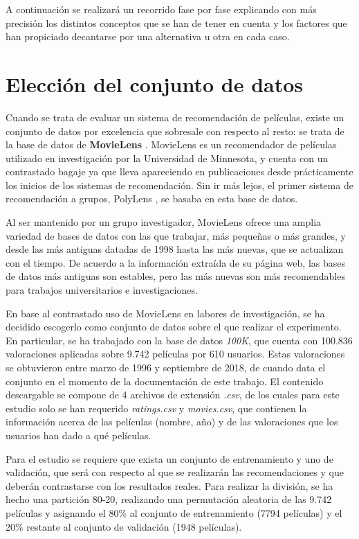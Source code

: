 A continuación se realizará un recorrido fase por fase explicando con más precisión los distintos conceptos que se han de tener en cuenta y los factores que han propiciado decantarse por una alternativa u otra en cada caso.

\section{Elección del conjunto de datos}

Cuando se trata de evaluar un sistema de recomendación de películas, existe un conjunto de datos por excelencia que sobresale con respecto al resto: se trata de la base de datos de \textbf{MovieLens} \cite{movielens} \cite{movielens-paper}. MovieLens es un recomendador de películas utilizado en investigación por la Universidad de Minnesota, y cuenta con un contrastado bagaje ya que lleva apareciendo en publicaciones desde prácticamente los inicios de los sistemas de recomendación. Sin ir más lejos, el primer sistema de recomendación a grupos, PolyLens \cite{polylens}, se basaba en esta base de datos.

Al ser mantenido por un grupo investigador, MovieLens ofrece una amplia variedad de bases de datos con las que trabajar, más pequeñas o más grandes, y desde las más antiguas datadas de 1998 hasta las más nuevas, que se actualizan con el tiempo. De acuerdo a la información extraída de su página web, las bases de datos más antiguas son estables, pero las más nuevas son más recomendables para trabajos universitarios e investigaciones.

En base al contrastado uso de MovieLens en labores de investigación, se ha decidido escogerlo como conjunto de datos sobre el que realizar el experimento. En particular, se ha trabajado con la base de datos \textit{100K}, que cuenta con 100.836 valoraciones aplicadas sobre 9.742 películas por 610 usuarios. Estas valoraciones se obtuvieron entre marzo de 1996 y septiembre de 2018, de cuando data el conjunto en el momento de la documentación de este trabajo. El contenido descargable se compone de 4 archivos de extensión \textit{.csv}, de los cuales para este estudio solo se han requerido \textit{ratings.csv} y \textit{movies.csv}, que contienen la información acerca de las películas (nombre, año) y de las valoraciones que los usuarios han dado a qué películas.

Para el estudio se requiere que exista un conjunto de entrenamiento y uno de validación, que será con respecto al que se realizarán las recomendaciones y que deberán contrastarse con los resultados reales. Para realizar la división, se ha hecho una partición 80-20, realizando una permutación aleatoria de las 9.742 películas y asignando el 80\% al conjunto de entrenamiento (7794 películas) y el 20\% restante al conjunto de validación (1948 películas).

